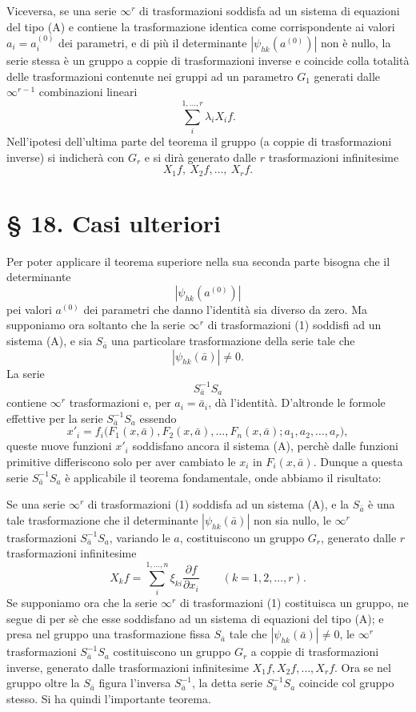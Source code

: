 \documentclass[11pt]{book}
\begin{document}
Viceversa, se una serie $\infty^r$ di trasformazioni soddisfa ad un sistema di equazioni del tipo (A) e contiene la trasformazione identica come corrispondente ai valori $a_i=a_i^{(0)}$ dei parametri, e di più il determinante $|\psi_{hk}(a^{(0)})|$ non è nullo, la serie stessa è un gruppo a coppie di trasformazioni inverse e coincide colla totalità delle trasformazioni contenute nei gruppi ad un parametro $G_1$ generati dalle $\infty^{r-1}$ combinazioni lineari
\[
 \sum\limits_i^{1,\ldots,r} \lambda_i X_i f.
\]
Nell'ipotesi dell'ultima parte del teorema il gruppo (a coppie di trasformazioni inverse) si indicherà con $G_r$ e si dirà generato dalle $r$ trasformazioni infinitesime
\[
 X_1f,\ X_2f,\ldots,\ X_rf.
\]

\section*{\S{} 18. Casi ulteriori}

Per poter applicare il teorema superiore nella sua seconda parte bisogna che il determinante
\[
 |\psi_{hk}(a^{(0)})|
\]
pei valori $a^{(0)}$ dei parametri che danno l'identità sia diverso da zero. Ma supponiamo ora soltanto che la serie $\infty^r$ di trasformazioni (1) soddisfi ad un sistema (A), e sia $S_{\bar a}$ una particolare trasformazione della serie tale che
\[
 |\psi_{hk}(\bar a)|\ne0.
\]
La serie
\[
 S_{\bar a}^{-1}S_a
\]
contiene $\infty^r$ trasformazioni e, per $a_i=\bar a_i$, dà l'identità. D'altronde le formole effettive per la serie $S_{\bar a}^{-1}S_a$ essendo
\[
 x'_i=f_i\bigl(F_1(x,\bar a),F_2(x,\bar a),\ldots,F_n(x,\bar a); a_1,a_2,\ldots,a_r\bigr),
\]
queste nuove funzioni $x'_i$ soddisfano ancora il sistema (A), perchè dalle funzioni primitive differiscono solo per aver cambiato le $x_i$ in $F_i(x,\bar a)$. Dunque a questa serie $S_{\bar a}^{-1}S_a$ è applicabile il teorema fondamentale, onde abbiamo il risultato:

Se una serie $\infty^r$ di trasformazioni (1) soddisfa ad un sistema (A), e la $S_{\bar a}$ è una tale trasformazione che il determinante $|\psi_{hk}(\bar a)|$ non sia nullo, le $\infty^r$ trasformazioni $S_{\bar a}^{-1}S_a$, variando le $a$, costituiscono un gruppo $G_r$, generato dalle $r$ trasformazioni infinitesime
\[
 X_kf=\sum\limits_i^{1,\ldots,n} \xi_{ki}\frac{\partial f}{\partial x_i}\qquad (k=1,2,\ldots,r).
\]
Se supponiamo ora che la serie $\infty^r$ di trasformazioni (1) costituisca un gruppo, ne segue di per sè che esse soddisfano ad un sistema di equazioni del tipo (A); e presa nel gruppo una trasformazione fissa $S_{\bar a}$ tale che $|\psi_{hk}(\bar a)|\ne0$, le $\infty^r$ trasformazioni $S_{\bar a}^{-1}S_a$ costituiscono un gruppo $G_r$ a coppie di trasformazioni inverse, generato dalle trasformazioni infinitesime $X_1f,X_2f,\ldots,X_rf$. Ora se nel gruppo oltre la $S_{\bar a}$ figura l'inversa $S_{\bar a}^{-1}$, la detta serie $S_{\bar a}^{-1}S_a$ coincide col gruppo stesso. Si ha quindi l'importante teorema.
\end{document}
